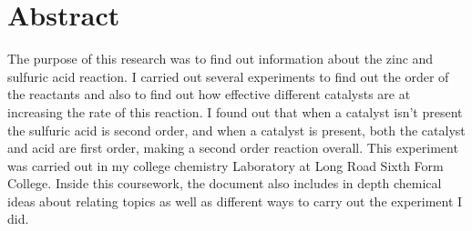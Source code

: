\chapter {Abstract}

The purpose of this research was to find out information about the zinc and sulfuric acid reaction. I carried out several experiments to find out the order of the reactants and also to find out how effective different catalysts are at increasing the rate of this reaction. I found out that when a catalyst isn't present the sulfuric acid is second order, and when a catalyst is present, both the catalyst and acid are first order, making a second order reaction overall. This experiment was carried out in my college chemistry Laboratory at Long Road Sixth Form College. Inside this coursework, the document also includes in depth chemical ideas about relating topics as well as different ways to carry out the experiment I did.